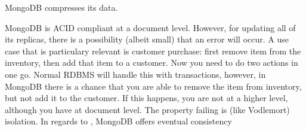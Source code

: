 MongoDB compresses its data.

MongoDB is ACID compliant at a document level. However, for updating all of its replicas, 
there is a possibility (albeit small) that an error will occur. A use case that is particulary relevant
is customer purchase: first remove item from the inventory, then add that item to a customer.
Now you need to do two actions in one go. Normal RDBMS will handle this with transactions,
however, in MongoDB there is a chance that you are able to remove the item from inventory, but not add
it to the customer. If this happens, you are not  at a higher level, although you have  at document level. The property failing is (like Vodlemort) isolation.
In regards to , MongoDB offers eventual consistency
